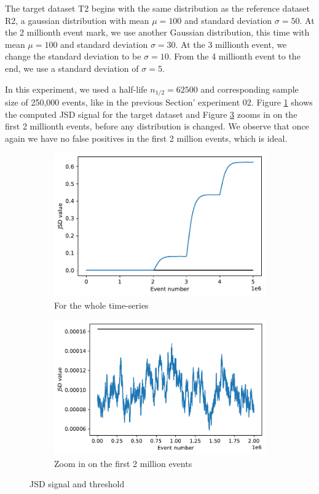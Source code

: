 The target dataset T2 begins with the same distribution as the reference dataset R2, a gaussian distribution with mean $\mu=100$ and standard deviation $\sigma=50$. At the 2 millionth event mark, we use another Gaussian distribution, this time with mean $\mu=100$ and standard deviation $\sigma=30$. At the 3 millionth event, we change the standard deviation to be $\sigma=10$. From the 4 millionth event to the end, we use a standard deviation of $\sigma=5$. 

In this experiment, we used a half-life $n_{1/2}=62500$ and corresponding sample size of 250,000 events, like in the previous Section' experiment 02. Figure \ref{fig:JSD-signal-test02} shows the computed JSD signal for the target dataset and Figure \ref{fig:JSD-signal-zoom-test02} zooms in on the first 2 millionth events, before any distribution is changed. We observe that once again we have no false positives in the first 2 million events, which is ideal. 
\begin{figure}[!htb]
\centering
\begin{subfigure}{.5\textwidth}
  \centering
  \includegraphics[width=1\linewidth]{figures/stream-analysis-viz-test02.pdf}
  \caption{For the whole time-series}
  \label{fig:JSD-signal-test02}
\end{subfigure}%
\begin{subfigure}{.5\textwidth}
  \centering
  \includegraphics[width=1\linewidth]{figures/stream-analysis-viz-zoom-test02.pdf}
  \caption{Zoom in on the first 2 million events}
  \label{fig:JSD-signal-zoom-test02}
\end{subfigure}
\caption{JSD signal and threshold}
\end{figure}
